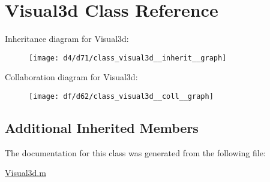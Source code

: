 \hypertarget{class_visual3d}{}\section{Visual3d Class Reference}
\label{class_visual3d}


Inheritance diagram for Visual3d\+:
\nopagebreak
\begin{figure}[H]
\begin{center}
\leavevmode
\texttt{[image: d4/d71/class\_visual3d\_\_inherit\_\_graph]}
\end{center}
\end{figure}


Collaboration diagram for Visual3d\+:
\nopagebreak
\begin{figure}[H]
\begin{center}
\leavevmode
\texttt{[image: df/d62/class\_visual3d\_\_coll\_\_graph]}
\end{center}
\end{figure}
\subsection*{Additional Inherited Members}


The documentation for this class was generated from the following file\+:\begin{DoxyCompactItemize}
\item 
\hyperlink{_visual3d_8m}{Visual3d.\+m}\end{DoxyCompactItemize}
